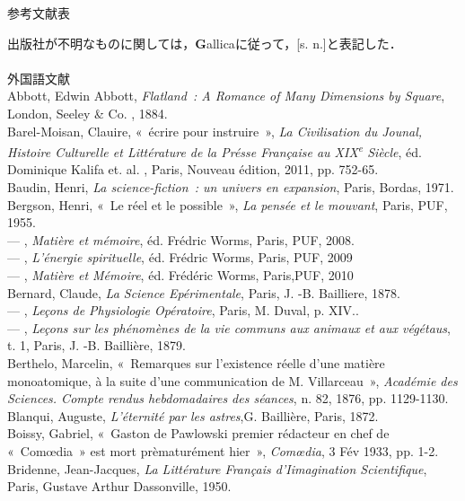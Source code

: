 \begin{center}
  {\Large 参考文献表}\\
\end{center}

{\small 出版社が不明なものに関しては，{\textbf Gallica}に従って，[s. n.]と表記した．}
\\
\\
{\large 外国語文献}\\
Abbott, Edwin Abbott, \emph{Flatland~: A Romance of Many Dimensions by Square}, London, Seeley \& Co. , 1884.\\
Barel-Moisan, Clauire, «~écrire pour instruire~», \emph{La Civilisation du Jounal, Histoire Culturelle et Littérature de la Présse Française au XIX\textsuperscript{e} Siècle}, éd. Dominique Kalifa et. al. , Paris, Nouveau édition, 2011, pp. 752-65.\\
Baudin, Henri, \emph{La science-fiction~: un univers en expansion}, Paris, Bordas, 1971.\\
Bergson, Henri, «~Le réel et le possible~», \emph{La pensée et le mouvant}, Paris, PUF, 1955.\\
--- , \emph{Matière et mémoire}, éd. Frédric Worms, Paris, PUF, 2008.\\
--- , \emph{L'énergie spirituelle}, éd. Frédric Worms, Paris, PUF, 2009\\
--- , \emph{Matière et Mémoire}, éd. Frédéric Worms, Paris,PUF, 2010\\
Bernard, Claude, \emph{La Science Epérimentale}, Paris, J. -B. Bailliere, 1878.\\
--- , \emph{Leçons de Physiologie Opératoire}, Paris, M. Duval, p. XIV..\\
--- , \emph{Leçons sur les phénomènes de la vie communs aux animaux et aux végétaus}, t. 1, Paris, J. -B. Baillière, 1879.\\
Berthelo, Marcelin, «~Remarques sur l'existence réelle d'une matière monoatomique, à la suite d'une communication de M. Villarceau~», \emph{Académie des Sciences. Compte rendus hebdomadaires des séances}, n. 82, 1876, pp. 1129-1130.\\
Blanqui, Auguste, \emph{L'éternité par les astres},G. Baillière, Paris, 1872.\\
Boissy, Gabriel, «~Gaston de Pawlowski premier rédacteur en chef de «~Comœdia~» est mort prèmaturément hier~», \emph{Comœdia}, 3 Fév 1933, pp. 1-2.
Bridenne, Jean-Jacques, \emph{La Littérature Français d'Iimagination Scientifique}, Paris, Gustave Arthur Dassonville, 1950.\\
